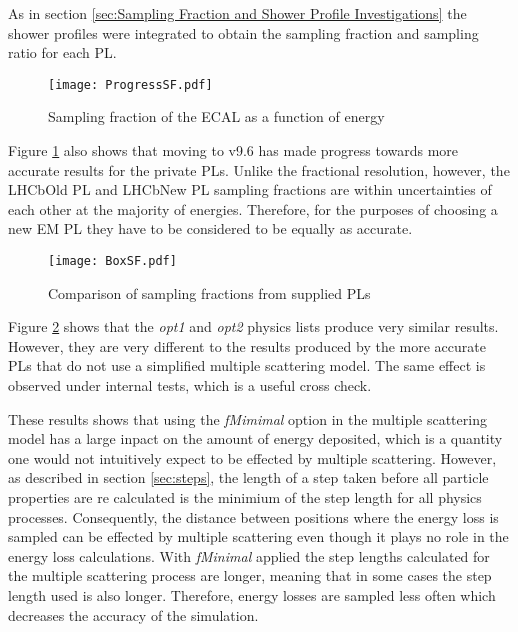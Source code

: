 As in section \ref{sec:Sampling Fraction and Shower Profile Investigations} the shower profiles were integrated to obtain the sampling fraction and sampling ratio for each PL.
\begin{figure}[h]
  \centering
  \texttt{[image: ProgressSF.pdf]}
  \caption{Sampling fraction of the ECAL as a function of energy}
  \label{fig:ProgressSF}
\end{figure}

Figure \ref{fig:ProgressSF} also shows that moving to \geant v9.6 has made progress towards more accurate results for the \lhcb private PLs.  Unlike the fractional resolution, however, the LHCbOld PL and LHCbNew PL sampling fractions are within uncertainties of each other at the majority of energies.  Therefore, for the purposes of choosing a new EM PL they have to be considered to be equally as accurate.

\begin{figure}[h]
  \centering
  \texttt{[image: BoxSF.pdf]}
  \caption{Comparison of sampling fractions from \geant supplied PLs}
  \label{fig:BoxSF}
\end{figure}
Figure \ref{fig:BoxSF} shows that the \textit{opt1} and \textit{opt2} physics lists produce very similar results.  However, they are very different to the results produced by the more accurate PLs that do not use a simplified multiple scattering model.  The same effect is observed under \geant internal tests, which is a useful cross check\cite{1742-6596-219-3-032045}.

These results shows that using the \textit{fMimimal} option in the multiple scattering model has a large inpact on the amount of energy deposited, which is a quantity one would not intuitively expect to be effected by multiple scattering.  However, as described in section \ref{sec:steps}, the length of a step taken before all particle properties are re calculated is the minimium of the step length for all physics processes.  Consequently, the distance between positions where the energy loss is sampled can be effected by multiple scattering even though it plays no role in the energy loss calculations.  With \textit{fMinimal} applied the step lengths calculated for the multiple scattering process are longer, meaning that in some cases the step length used is also longer.  Therefore, energy losses are sampled less often which decreases the accuracy of the simulation.

